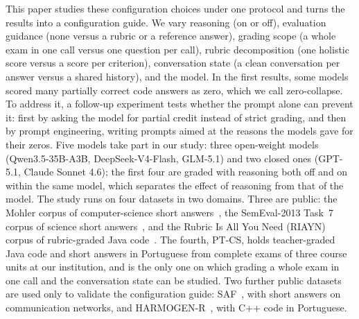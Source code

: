 This paper studies these configuration choices under one protocol and turns the results into a
configuration guide. We vary reasoning (on or off), evaluation guidance (none versus a rubric or a
reference answer), grading scope (a whole exam in one call versus one question per call), rubric
decomposition (one holistic score versus a score per criterion), conversation state (a clean
conversation per answer versus a shared history), and the model. In the first results, some models
scored many partially correct code answers as zero, which we call zero-collapse. To address it, a follow-up
experiment tests whether the prompt alone can prevent it: first by asking the model for partial credit instead
of strict grading, and then by prompt engineering, writing prompts aimed at the reasons the models gave for
their zeros. Five models take part in our study: three open-weight models (Qwen3.5-35B-A3B, DeepSeek-V4-Flash,
GLM-5.1) and two closed ones (GPT-5.1, Claude Sonnet 4.6); the first four are graded with
reasoning both off and on within the same model, which separates the effect of reasoning from that of the model.
The study runs on four datasets in two domains. Three are public: the Mohler corpus of computer-science short
answers~\cite{mohler_text_2009,mohler_learning_2011}, the SemEval-2013 Task~7 corpus of science short
answers~\cite{dzikovska_semeval_2013}, and the Rubric Is All You Need (RIAYN) corpus of rubric-graded Java
code~\cite{pathak_rubric_2025}. The fourth, PT-CS, holds teacher-graded Java code and short answers in Portuguese
from complete exams of three course units at our institution, and is the only one on which grading a whole exam in one
call and the conversation state can be studied. Two further public datasets are used only to validate the
configuration guide: SAF~\cite{filighera_saf_2022}, with short answers on communication networks, and
HARMOGEN-R~\cite{mendonca_harmogenr_2026}, with C++ code in Portuguese.

